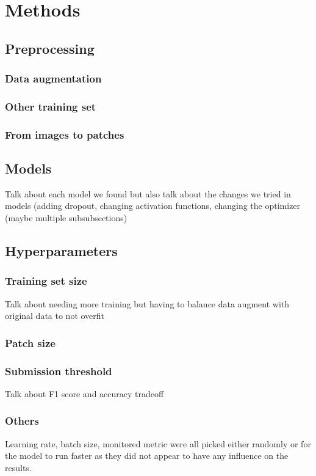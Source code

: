 \documentclass[10pt,conference,compsocconf]{IEEEtran}
\begin{document}
\section{Methods}
\subsection{Preprocessing}
\subsubsection{Data augmentation}
\subsubsection{Other training set}
\subsubsection{From images to patches}
\subsection{Models}
Talk about each model we found but also talk about the changes we tried in models (adding dropout, changing activation functions, changing the optimizer (maybe multiple subsubsections)

\subsection{Hyperparameters}
\subsubsection{Training set size}
Talk about needing more training but having to balance data augment with original data to not overfit
\subsubsection{Patch size}
\subsubsection{Submission threshold}
Talk about F1 score and accuracy tradeoff
\subsubsection{Others}
Learning rate, batch size, monitored metric were all picked either randomly or for the model to run faster as they did not appear to have any influence on the results.
\end{document}
